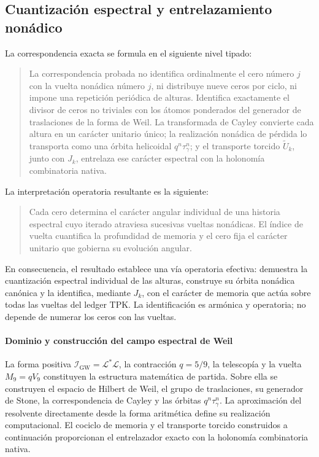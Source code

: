 \subsection{Cuantización espectral y entrelazamiento nonádico}
La correspondencia exacta se formula en el siguiente nivel tipado:\par
\begin{quote}
La correspondencia probada no identifica ordinalmente el cero número \(j\) con la vuelta nonádica número \(j\), ni distribuye nueve ceros por ciclo, ni impone una repetición periódica de alturas. Identifica exactamente el divisor de ceros no triviales con los átomos ponderados del generador de traslaciones de la forma de Weil. La transformada de Cayley convierte cada altura en un carácter unitario único; la realización nonádica de pérdida lo transporta como una órbita helicoidal \(q^n\tau_\gamma^n\); y el transporte torcido \(\widetilde U_k\), junto con \(J_k\), entrelaza ese carácter espectral con la holonomía combinatoria nativa.\par
\end{quote}
La interpretación operatoria resultante es la siguiente:\par
\begin{quote}
Cada cero determina el carácter angular individual de una historia espectral cuyo iterado atraviesa sucesivas vueltas nonádicas. El índice de vuelta cuantifica la profundidad de memoria y el cero fija el carácter unitario que gobierna su evolución angular.\par
\end{quote}
En consecuencia, el resultado establece una vía operatoria efectiva: demuestra la cuantización espectral individual de las alturas, construye su órbita nonádica canónica y la identifica, mediante \(J_k\), con el carácter de memoria que actúa sobre todas las vueltas del ledger TPK. La identificación es armónica y operatoria; no depende de numerar los ceros con las vueltas.\par
\paragraph{Dominio y construcción del campo espectral de Weil}
La forma positiva \(\mathscr I_{\mathrm{GW}}=\mathscr L^*\mathscr L\), la contracción \(q=5/9\), la telescopía y la vuelta \(M_9=qV_9\) constituyen la estructura matemática de partida. Sobre ella se construyen el espacio de Hilbert de Weil, el grupo de traslaciones, su generador de Stone, la correspondencia de Cayley y las órbitas \(q^n\tau_\gamma^n\). La aproximación del resolvente directamente desde la forma aritmética define su realización computacional. El cociclo de memoria y el transporte torcido construidos a continuación proporcionan el entrelazador exacto con la holonomía combinatoria nativa.

